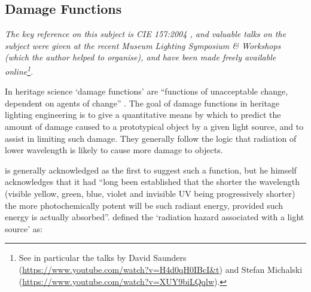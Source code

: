 
\subsection{Damage Functions} \label{sec:DamageIndex}


\textit{The key reference on this subject is \gls{CIE} 157:2004 \citep{cie_cie_2004}, and valuable talks on the subject were given at the recent Museum Lighting Symposium \& Workshops \citep{pokorska_book_2017} (which the author helped to organise), and have been made freely available online\footnote{See in particular the talks by David Saunders (\url{https://www.youtube.com/watch?v=H4d0qH0IBcI&t}) and Stefan Michalski (\url{https://www.youtube.com/watch?v=XUY9biLQqlw}).}}.

\bigskip

In heritage science `damage functions' are ``functions of unacceptable change, dependent on agents of change'' \citep{strlic_damage_2013}. The goal of damage functions in heritage lighting engineering is to give a quantitative means by which to predict the amount of damage caused to a prototypical object by a given light source, and to assist in limiting such damage. They generally follow the logic that radiation of lower wavelength is likely to cause more damage to objects.

\citet{harrison_report_1953} is generally acknowledged as the first to suggest such a function, but he himself acknowledges that it had ``long been established that the shorter the wavelength (visible yellow, green, blue, violet and invisible UV being progressively shorter) the more photochemically potent will be such radiant energy, provided such energy is actually absorbed''. \citet[p.9]{harrison_report_1953} defined the `radiation hazard associated with a light source' as:

